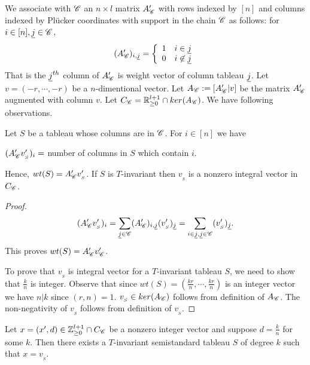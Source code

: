     We associate with $\mathscr{C}$ an \(n \times l\) matrix \(A'_{\mathscr{C}}\) with rows indexed by \([n]\) and columns indexed by Pl\"{u}cker coordinates with support in the chain \(\mathscr{C}\) as follows: for \(i \in [n],\underline{j} \in \mathscr{C}\),
    \[
        (A'_{\mathscr{C}})_{i,\underline{j}}=
        \left\{\begin{array}{cc}
            1  &  i \in \underline{j}\\
            0  &  i \not\in \underline{j}
        \end{array}\right.
    \]
That is the \(\underline{j}^{th}\) column of \(A'_{\mathscr{C}}\) is weight vector of column tableau \(\underline{j}\). Let \(v = (-r,\cdots,-r)\) be a \(n\)-dimentional vector. Let \(A_{\mathscr{C}} := [A'_{\mathscr{C}}|v]\) be the matrix \(A'_{\mathscr{C}}\) augmented with column \(v\). Let \(C_{\mathscr{C}} = \mathbb{R}_{\ge0}^{l+1} \cap ker(A_{\mathscr{C}})\). We have following observations.
    \begin{observation}
        \label{obs:tableauasvector}
        Let \(S\) be a tableau whose columns are in \(\mathscr{C}\). For \(i \in [n]\) we have
        \begin{center}
        \((A'_{\mathscr{C}}v'_{_S})_{i} = \) number of columns in \(S\) which contain \(i\).
        \end{center}
        Hence, \(wt(S) = A'_{\mathscr{C}}v'_{_S}\). If \(S\) is \(T\)-invariant then \(v_{_S}\) is a nonzero integral vector in \(C_{\mathscr{C}}\).
    \end{observation}
    \begin{proof}
        \[
            (A'_{\mathscr{C}}v'_{_S})_{i} 
            = \sum_{\underline{j} \in \mathscr{C}} (A'_{\mathscr{C}})_{i,\underline{j}} (v'_{_S})_{\underline{j}}
            = \sum_{i \in \underline{j},\underline{j}\in \mathscr{C}} (v'_{_S})_{\underline{j}}.
        \]
        This proves \(wt(S) = A'_{\mathscr{C}}v'_{\mathscr{C}}\). 

        To prove that \(v_{_S}\) is integral vector for a \(T\)-invariant tableau \(S\), we need to show that \(\frac{k}{n}\) is integer. Observe that since \(wt(S) = (\frac{kr}{n},\cdots,\frac{kr}{n})\) is an integer vector we have \(n|k\) since \((r,n)=1\).  \(v_{_S} \in ker(A_{\mathscr{C}})\) follows from definition of \(A_{\mathscr{C}}\). The non-negativity of \(v_{_S}\) follows from definition of \(v_{_S}\).
    \end{proof}
    \begin{observation}
        Let \(x=(x',d)\in \mathbb{Z}_{\ge0}^{l+1}\cap C_{\mathscr{C}}\) be a nonzero integer vector and suppose $d=\frac{k}{n}$ for some \(k\). Then there exists a \(T\)-invariant semistandard tableau \(S\) of degree \(k\) such that \(x=v_{_S}\).
    \end{observation}
